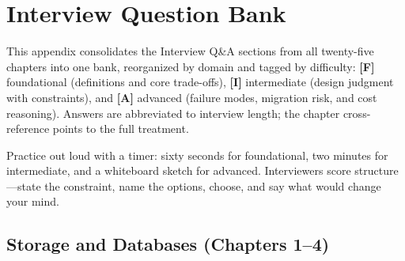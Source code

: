 \chapter{Interview Question Bank}
%
This appendix consolidates the Interview Q\&A sections from all twenty-five chapters into one
bank, reorganized by domain and tagged by difficulty: \textbf{[F]} foundational (definitions and
core trade-offs), \textbf{[I]} intermediate (design judgment with constraints), and
\textbf{[A]} advanced (failure modes, migration risk, and cost reasoning). Answers are
abbreviated to interview length; the chapter cross-reference points to the full treatment.

\begin{tipbox}
Practice out loud with a timer: sixty seconds for foundational, two minutes for intermediate,
and a whiteboard sketch for advanced. Interviewers score structure---state the constraint, name
the options, choose, and say what would change your mind.
\end{tipbox}

\section{Storage and Databases (Chapters 1--4)}

